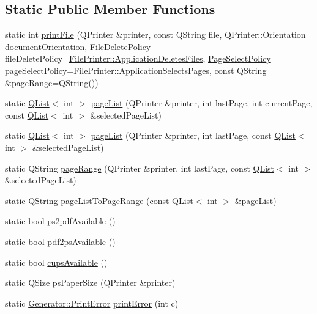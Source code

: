 \subsection*{Static Public Member Functions}
\begin{DoxyCompactItemize}
\item 
static int \hyperlink{classOkular_1_1FilePrinter_abd5ec189d80d15983c49f91f7e1d38c1}{print\+File} (Q\+Printer \&printer, const Q\+String file, Q\+Printer\+::\+Orientation document\+Orientation, \hyperlink{classOkular_1_1FilePrinter_acd01eb48e99f9289a7f4786a366ef7ba}{File\+Delete\+Policy} file\+Delete\+Policy=\hyperlink{classOkular_1_1FilePrinter_acd01eb48e99f9289a7f4786a366ef7baa3dc2e24676385e73e2e9f623c49cc94a}{File\+Printer\+::\+Application\+Deletes\+Files}, \hyperlink{classOkular_1_1FilePrinter_a755b647910344031db1d79312482981d}{Page\+Select\+Policy} page\+Select\+Policy=\hyperlink{classOkular_1_1FilePrinter_a755b647910344031db1d79312482981da3910c7efe4c8f4f8a69459765bea25a4}{File\+Printer\+::\+Application\+Selects\+Pages}, const Q\+String \&\hyperlink{classOkular_1_1FilePrinter_a7a62a72292d1756871321f48446927e3}{page\+Range}=Q\+String())
\item 
static \hyperlink{classQList}{Q\+List}$<$ int $>$ \hyperlink{classOkular_1_1FilePrinter_aed485e5e3fbe591b16e15915e318a1b7}{page\+List} (Q\+Printer \&printer, int last\+Page, int current\+Page, const \hyperlink{classQList}{Q\+List}$<$ int $>$ \&selected\+Page\+List)
\item 
static \hyperlink{classQList}{Q\+List}$<$ int $>$ \hyperlink{classOkular_1_1FilePrinter_a94933ee7a272148b12f3f9cf1a2f4920}{page\+List} (Q\+Printer \&printer, int last\+Page, const \hyperlink{classQList}{Q\+List}$<$ int $>$ \&selected\+Page\+List)
\item 
static Q\+String \hyperlink{classOkular_1_1FilePrinter_a7a62a72292d1756871321f48446927e3}{page\+Range} (Q\+Printer \&printer, int last\+Page, const \hyperlink{classQList}{Q\+List}$<$ int $>$ \&selected\+Page\+List)
\item 
static Q\+String \hyperlink{classOkular_1_1FilePrinter_a38b67ef91d28b3f9d5d383572e23b92d}{page\+List\+To\+Page\+Range} (const \hyperlink{classQList}{Q\+List}$<$ int $>$ \&\hyperlink{classOkular_1_1FilePrinter_aed485e5e3fbe591b16e15915e318a1b7}{page\+List})
\item 
static bool \hyperlink{classOkular_1_1FilePrinter_a047b30a135796c064fda2823ae6c0ddb}{ps2pdf\+Available} ()
\item 
static bool \hyperlink{classOkular_1_1FilePrinter_af93f96fc338c59335071b664437df886}{pdf2ps\+Available} ()
\item 
static bool \hyperlink{classOkular_1_1FilePrinter_ac4fa1b8818f90dbae9d7337dadbb80b3}{cups\+Available} ()
\item 
static Q\+Size \hyperlink{classOkular_1_1FilePrinter_ade49b65682fe231b1437a1e045486869}{ps\+Paper\+Size} (Q\+Printer \&printer)
\item 
static \hyperlink{classOkular_1_1Generator_a43266d4eb3e7929924dd10ea53bc1d61}{Generator\+::\+Print\+Error} \hyperlink{classOkular_1_1FilePrinter_aee2cfc9da47e38eb986a7f42dd774b41}{print\+Error} (int c)
\end{DoxyCompactItemize}
